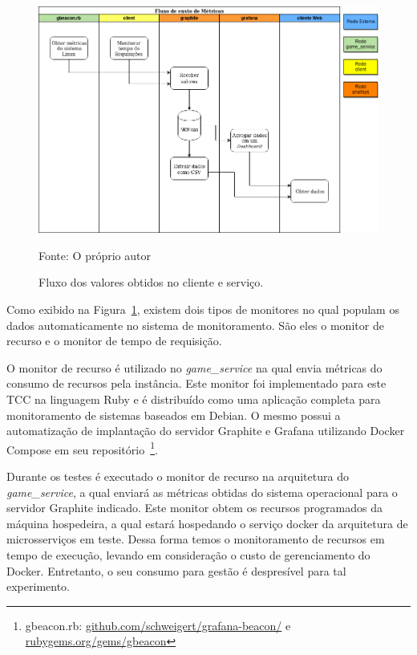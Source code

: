 \begin{figure}[htb!]
    \caption{Fluxo dos valores obtidos no cliente e serviço.}
    \label{fig:fluxo_data}
    \includegraphics[width=\textwidth]{img/cap5/fluxo_metricas.png}
    \centering
    
    Fonte: O próprio autor
\end{figure}

Como exibido na Figura~\ref{fig:fluxo_data}, existem dois tipos de monitores no qual populam os dados automaticamente no sistema de monitoramento.
%
São eles o monitor de recurso e  o monitor de tempo de requisição. 

O monitor de recurso é utilizado no \textit{game\_service} na qual envia métricas do consumo de recursos pela instância.
%
Este monitor foi implementado para este TCC na linguagem Ruby e é distribuído como uma aplicação completa para monitoramento de sistemas baseados em Debian.
%
O mesmo possui a automatização de implantação do servidor Graphite e Grafana utilizando Docker Compose em seu repositório~\footnote{gbeacon.rb: \url{github.com/schweigert/grafana-beacon/} e \url{rubygems.org/gems/gbeacon}}.

Durante os testes é executado o monitor de recurso na arquitetura do \textit{game\_service}, a qual enviará as métricas obtidas do sistema operacional para o servidor Graphite indicado.
%
Este monitor obtem os recursos programados da máquina hospedeira, a qual estará hospedando o serviço docker da arquitetura de microsserviços em teste.
%
Dessa forma temos o monitoramento de recursos em tempo de execução, levando em consideração o custo de gerenciamento do Docker.
%
Entretanto, o seu consumo para gestão é despresível para tal experimento.

